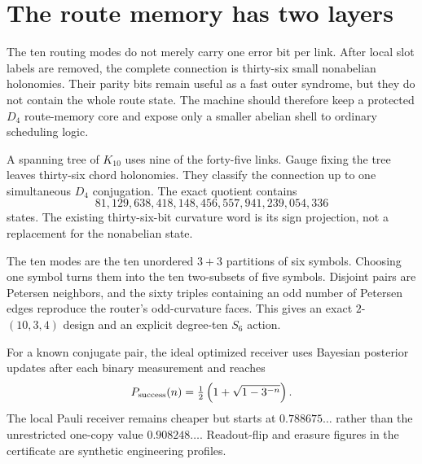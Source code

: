 \section{The route memory has two layers}
\label{sec:bt2974-bt2983-blueprint}

\begin{plain}
The ten routing modes do not merely carry one error bit per link.  After local
slot labels are removed, the complete connection is thirty-six small nonabelian
holonomies.  Their parity bits remain useful as a fast outer syndrome, but they
do not contain the whole route state.  The machine should therefore keep a
protected $D_4$ route-memory core and expose only a smaller abelian shell to
ordinary scheduling logic.
\end{plain}

\begin{spec}
A spanning tree of $K_{10}$ uses nine of the forty-five links.  Gauge fixing the
tree leaves thirty-six chord holonomies.  They classify the connection up to one
simultaneous $D_4$ conjugation.  The exact quotient contains
\[
81{,}129{,}638{,}418{,}148{,}456{,}557{,}941{,}239{,}054{,}336
\]
states.  The existing thirty-six-bit curvature word is its sign projection, not
a replacement for the nonabelian state.
\end{spec}

\begin{spec}
The ten modes are the ten unordered $3+3$ partitions of six symbols.  Choosing
one symbol turns them into the ten two-subsets of five symbols.  Disjoint pairs
are Petersen neighbors, and the sixty triples containing an odd number of
Petersen edges reproduce the router's odd-curvature faces.  This gives an exact
$2$-$(10,3,4)$ design and an explicit degree-ten $S_6$ action.
\end{spec}

\begin{spec}
For a known conjugate pair, the ideal optimized receiver uses Bayesian posterior
updates after each binary measurement and reaches
\[
P_{\rm success}(n)=\tfrac12\left(1+\sqrt{1-3^{-n}}\right).
\]
The local Pauli receiver remains cheaper but starts at $0.788675\ldots$ rather
than the unrestricted one-copy value $0.908248\ldots$.  Readout-flip and erasure
figures in the certificate are synthetic engineering profiles.
\end{spec}

